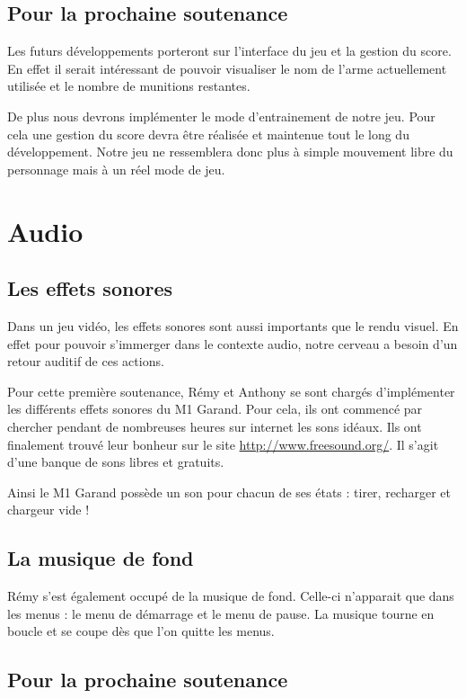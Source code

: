 \documentclass[11pt]{report}
\begin{document}
\subsection{Pour la prochaine soutenance}

Les futurs développements porteront sur l'interface du jeu et la gestion du score. En effet il serait intéressant de pouvoir visualiser le nom de l'arme actuellement utilisée et le nombre de munitions restantes.

De plus nous devrons implémenter le mode d'entrainement de notre jeu. Pour cela une gestion du score devra être réalisée et maintenue tout le long du développement. Notre jeu ne ressemblera donc plus à simple mouvement libre du personnage mais à un réel mode de jeu.


\newpage
\section{Audio}

\subsection{Les effets sonores}

Dans un jeu vidéo, les effets sonores sont aussi importants que le rendu visuel. En effet pour pouvoir s'immerger dans le contexte audio, notre cerveau a besoin d'un retour auditif de ces actions.

Pour cette première soutenance, Rémy et Anthony se sont chargés d'implémenter les différents effets sonores du M1 Garand. Pour cela, ils ont commencé par chercher pendant de nombreuses heures sur internet les sons idéaux. Ils ont finalement trouvé leur bonheur sur le site \url{http://www.freesound.org/}. Il s'agit d'une banque de sons libres et gratuits.

Ainsi le M1 Garand possède un son pour chacun de ses états : tirer, recharger et chargeur vide !

\subsection{La musique de fond}

Rémy s'est également occupé de la musique de fond. Celle-ci n'apparait que dans les menus : le menu de démarrage et le menu de pause. La musique tourne en boucle et se coupe dès que l'on quitte les menus.

\subsection{Pour la prochaine soutenance}
\end{document}
